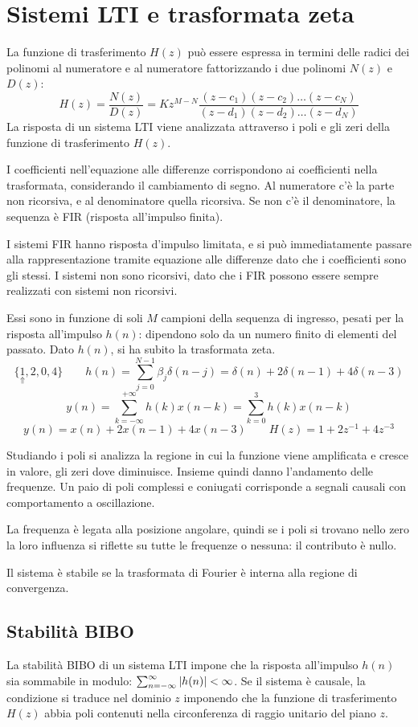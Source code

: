 \section{Sistemi LTI e trasformata zeta}
La funzione di trasferimento $H(z)$ può essere espressa in termini delle radici dei polinomi al numeratore e al numeratore fattorizzando i due polinomi $N(z)$ e $D(z)$:
$$H(z) = \frac{N(z)}{D(z)} = Kz^{M-N} \frac{(z-c_1)(z-c_2) \dots (z-c_N)}{(z-d_1)(z-d_2)\dots(z-d_N)}$$
La risposta di un sistema LTI viene analizzata attraverso i poli e gli zeri della funzione di trasferimento $H(z)$.

I coefficienti nell'equazione alle differenze corrispondono ai coefficienti nella trasformata, considerando il cambiamento di segno. Al numeratore c'è la parte non ricorsiva, e al denominatore quella ricorsiva. Se non c'è il denominatore, la sequenza è FIR (risposta all'impulso finita).

I sistemi FIR hanno risposta d'impulso limitata, e si può immediatamente passare alla rappresentazione tramite equazione alle differenze dato che i coefficienti sono gli stessi. I sistemi non sono ricorsivi, dato che i FIR possono essere sempre realizzati con sistemi non ricorsivi.

Essi sono in funzione di soli $M$ campioni della sequenza di ingresso, pesati per la risposta all'impulso $h(n)$: dipendono solo da un numero finito di elementi del passato. Dato $h(n)$, si ha subito la trasformata zeta.
$$\{\underset{\Uparrow}1, 2, 0, 4\} \qquad h(n) = \sum_{j=0}^{N-1}\beta_j\delta(n - j) = \delta(n) + 2\delta(n - 1) + 4\delta(n - 3)$$
$$y(n) = \sum_{k=-\infty}^{+\infty} h(k)x(n-k) = \sum_{k=0}^{3}h(k)x(n-k)$$
$$y(n) = x(n) + 2x(n-1) + 4x(n-3) \qquad H(z) = 1+2z^{-1} + 4z^{-3}$$


Studiando i poli si analizza la regione in cui la funzione viene amplificata e cresce in valore, gli zeri dove diminuisce. Insieme quindi danno l'andamento delle frequenze. Un paio di poli complessi e coniugati corrisponde a segnali causali con comportamento a oscillazione.

La frequenza è legata alla posizione angolare, quindi se i poli si trovano nello zero la loro influenza si riflette su tutte le frequenze o nessuna: il contributo è nullo.

Il sistema è stabile se la trasformata di Fourier è interna alla regione di convergenza. 


\subsection{Stabilità BIBO}
La stabilità BIBO di un sistema LTI impone che la risposta all'impulso $h(n)$ sia sommabile in modulo: $\sum_{n=-\infty}^{\infty}\left|h(n)\right| < \infty$. Se il sistema è causale, la condizione si traduce nel dominio $z$ imponendo che la funzione di trasferimento $H(z)$ abbia poli contenuti nella circonferenza di raggio unitario del piano $z$. 

